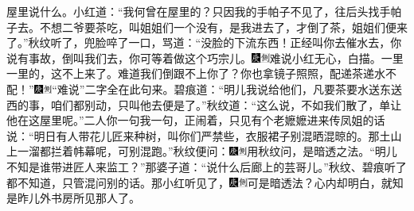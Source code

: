 屋里说什么。小红道：“我何曾在屋里的？只因我的手帕子不见了，往后头找手帕子去。不想二爷要茶吃，叫姐姐们一个没有，是我进去了，才倒了茶，姐姐们便来了。”秋纹听了，兜脸啐了一口，骂道：“没脸的下流东西！正经叫你去催水去，你说有事故，倒叫我们去，你可等着做这个巧宗儿。{\includegraphics[width=3mm]{../Images/00004}\includegraphics[width=3mm]{../Images/00011}\footnotesize \kaishu 难说小红无心，白描。}一里一里的，这不上来了。难道我们倒跟不上你了？你也拿镜子照照，配递茶递水不配！”{\includegraphics[width=3mm]{../Images/00004}\includegraphics[width=3mm]{../Images/00011}\footnotesize \kaishu “难说”二字全在此句来。}碧痕道：“明儿我说给他们，凡要茶要水送东送西的事，咱们都别动，只叫他去便是了。”秋纹道：“这么说，不如我们散了，单让他在这屋里呢。”二人你一句我一句，正闹着，只见有个老嬷嬷进来传凤姐的话说：“明日有人带花儿匠来种树，叫你们严禁些，衣服裙子别混晒混晾的。那土山上一溜都拦着帏幕呢，可别混跑。”秋纹便问：{\includegraphics[width=3mm]{../Images/00004}\includegraphics[width=3mm]{../Images/00011}\footnotesize \kaishu 用秋纹问，是暗透之法。}“明儿不知是谁带进匠人来监工？”那婆子道：“说什么后廊上的芸哥儿。”秋纹、碧痕听了都不知道，只管混问别的话。那小红听见了，{\includegraphics[width=3mm]{../Images/00004}\includegraphics[width=3mm]{../Images/00011}\footnotesize \kaishu 可是暗透法？}心内却明白，就知是昨儿外书房所见那人了。

